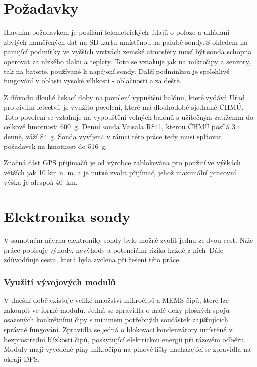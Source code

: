 \documentclass[twoside]{ctuthesis}
\theoremstyle{plain}
\theoremstyle{definition}
\theoremstyle{note}
\begin{document}

	\section{Požadavky}
	Hlavním požadavkem je posílání telemetrických údajů o poloze a ukládání zbylých naměřených dat na SD kartu umístěnou na palubě sondy. S ohledem na panující podmínky ve vyšších vrstvách zemské atmosféry musí být sonda schopna operovat za nízkého tlaku a teploty. Toto se vztahuje jak na mikročipy a senzory, tak na baterie, používané k napájení sondy. Další podmínkou je spolehlivé fungování v oblasti vysoké vlhkosti - oblačnosti a za deště. 

	Z důvodu dlouhé čekací doby na povolení vypuštění balónu, které vydává Úřad pro civilní letectví, je využito povolení, které má dlouhodobě sjednané ČHMÚ. Toto povolení se vztahuje na vypouštění volných balónů s užitečným zatížením do celkové hmotnosti 600~g. Denní sonda Vaisala RS41, kterou ČHMÚ posílá 3$\times$ denně, váží 84~g. Sonda vyvíjená v rámci této práce tedy musí splňovat požadavek na hmotnost do 516~g.

	Značná část GPS přijímačů je od výrobce zablokována pro použití ve výškách větších jak 10 km n. m. a je nutné zvolit přijímač, jehož maximální pracovní výška je alespoň 40~km.


	
	\section{Elektronika sondy}

	V samotném návrhu elektroniky sondy bylo možné zvolit jednu ze dvou cest. Níže práce popisuje výhody, nevýhody a potenciální rizika každé z nich. Dále zdůvodňuje cestu, která byla zvolena při řešení této práce.

		\subsubsection{Využití vývojových modulů}
		V dnešní době existuje veliké množství mikročipů a MEMS čipů, které lze zakoupit ve formě modulů. Jedná se zpravidla o malé deky plošných spojů osazených konkrétními čipy s minimem potřebných součástek zajišťujících správné fungování. Zpravidla se jedná o blokovací kondenzátory umístěné v bezprostřední blízkosti čipů, poskytující elektrickou energii při rázovém odběru. Moduly mají vyvedené piny mikročipů na pinové lišty nacházející se zpravidla na okraji DPS. 
\end{document}
